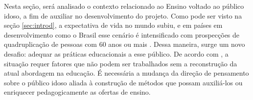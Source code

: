 






Nesta seção, será analisado o contexto relacionado ao Ensino voltado ao público idoso, a fim de auxiliar no desenvolvimento do projeto. 
Como pode ser visto na seção \ref{sec:introd}, a expectativa de vida no mundo subiu, e em países em desenvolvimento como o Brasil esse cenário é intensificado com prospecções de quadruplicação de pessoas com 60 anos ou mais \citep{demografico2010disponivel}. Dessa maneira, surge um novo desafio: adequar as práticas educacionais a esse público. De acordo com \cite{rethinkingTeacherEducation}, a situação requer fatores  que não podem ser trabalhados sem a reconstrução da atual abordagem na educação. É necessária a mudança da direção de pensamento sobre o público idoso aliada à construção de métodos que possam auxiliá-los ou enriquecer pedagogicamente as ofertas de ensino.

